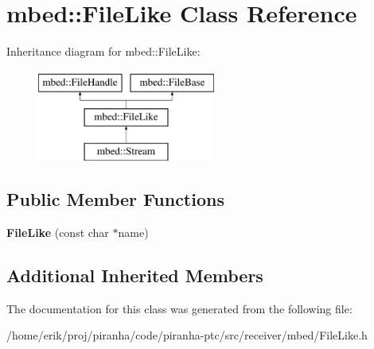 \hypertarget{classmbed_1_1FileLike}{}\section{mbed\+:\+:File\+Like Class Reference}
\label{classmbed_1_1FileLike}
Inheritance diagram for mbed\+:\+:File\+Like\+:\begin{figure}[H]
\begin{center}
\leavevmode
\includegraphics[height=3.000000cm]{classmbed_1_1FileLike}
\end{center}
\end{figure}
\subsection*{Public Member Functions}
\begin{DoxyCompactItemize}
\item 
{\bfseries File\+Like} (const char $\ast$name)\hypertarget{classmbed_1_1FileLike_a45088db3d27b7f4461bf3017dfa959b5}{}\label{classmbed_1_1FileLike_a45088db3d27b7f4461bf3017dfa959b5}

\end{DoxyCompactItemize}
\subsection*{Additional Inherited Members}


The documentation for this class was generated from the following file\+:\begin{DoxyCompactItemize}
\item 
/home/erik/proj/piranha/code/piranha-\/ptc/src/receiver/mbed/File\+Like.\+h\end{DoxyCompactItemize}
